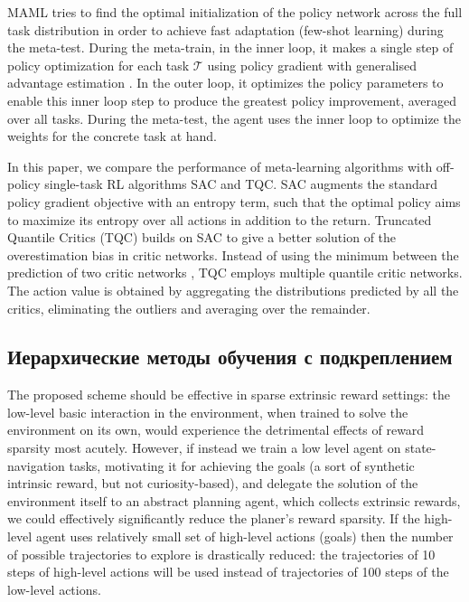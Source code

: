 MAML tries to find the optimal initialization of the policy network across the full task distribution in order to achieve fast adaptation (few-shot learning) during the meta-test. During the meta-train, in the inner loop, it makes a single step of policy optimization for each task $\mathcal{T}$ using policy gradient with generalised advantage estimation \cite{gae}. In the outer loop, it optimizes the policy parameters to enable this inner loop step to produce the greatest policy improvement, averaged over all tasks. %
During the meta-test, the agent uses the inner loop to optimize the weights for the concrete task at hand. 

In this paper, we compare the performance of meta-learning algorithms with off-policy single-task RL algorithms SAC and TQC. SAC \cite{sac, sac_applications} %
augments the standard policy gradient objective with an entropy term, such that the optimal policy aims to maximize its entropy over all actions in addition to the return. Truncated Quantile Critics (TQC) \cite{tqc} builds on SAC to give a better solution of the overestimation bias in critic networks. Instead of using the minimum between the prediction of two critic networks \cite{two_nets_critic}, TQC employs multiple quantile critic networks. The action value is obtained by aggregating the distributions predicted by all the critics, eliminating the outliers and averaging over the remainder. 



\subsection{Иерархические методы обучения с подкреплением}

The proposed scheme should be effective in sparse extrinsic reward settings: the low-level basic interaction in the environment, when trained to solve the environment on its own, would experience the detrimental effects of reward sparsity most acutely. However, if instead we train a low level agent on state-navigation tasks, motivating it for achieving the goals (a sort of synthetic intrinsic reward, but not curiosity-based), and delegate the solution of the environment itself to an abstract planning agent, which collects extrinsic rewards, we could effectively significantly reduce the planer's reward sparsity. If the high-level agent uses relatively small set of high-level actions (goals) then the number of possible trajectories to explore is drastically reduced: the trajectories of 10 steps of high-level actions will be used instead of trajectories of 100 steps of the low-level actions.

